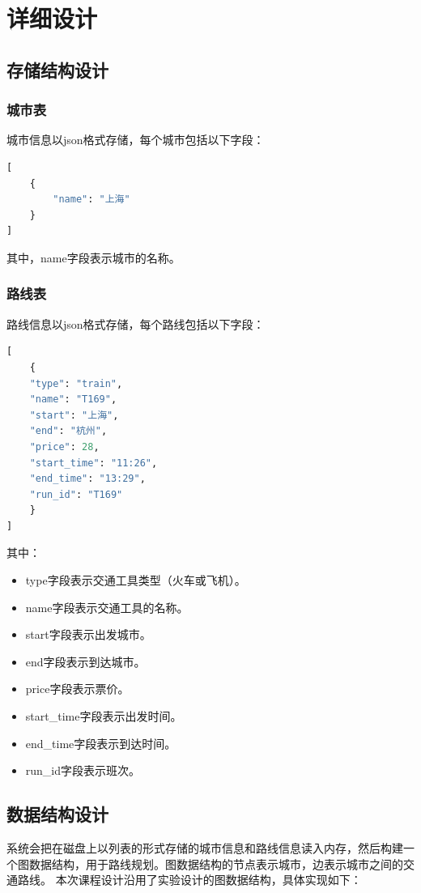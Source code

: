 \documentclass[10pt]{article}
\begin{document}
    \section{详细设计}

    \subsection{存储结构设计}

    \subsubsection{城市表}
    城市信息以json格式存储，每个城市包括以下字段：
    \begin{lstlisting}[language=Python]
[
    {
        "name": "上海"
    }
]
    \end{lstlisting}
    其中，name字段表示城市的名称。

    \subsubsection{路线表}
    路线信息以json格式存储，每个路线包括以下字段：
    \begin{lstlisting}[language=Python]
[
    {
    "type": "train",
    "name": "T169",
    "start": "上海",
    "end": "杭州",
    "price": 28,
    "start_time": "11:26",
    "end_time": "13:29",
    "run_id": "T169"
    }
]
    \end{lstlisting}
    其中：
    \begin{itemize}
        \item type字段表示交通工具类型（火车或飞机）。
        \item name字段表示交通工具的名称。
        \item start字段表示出发城市。
        \item end字段表示到达城市。
        \item price字段表示票价。
        \item start\_time字段表示出发时间。
        \item end\_time字段表示到达时间。
        \item run\_id字段表示班次。
    \end{itemize}

    \subsection{数据结构设计}

    系统会把在磁盘上以列表的形式存储的城市信息和路线信息读入内存，然后构建一个图数据结构，用于路线规划。图数据结构的节点表示城市，边表示城市之间的交通路线。
    本次课程设计沿用了实验设计的图数据结构，具体实现如下：
\end{document}
